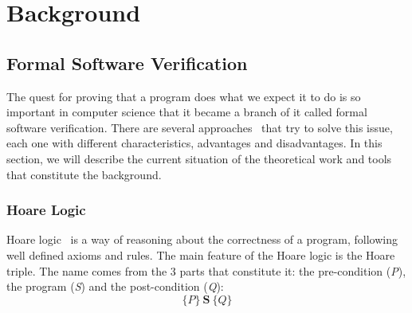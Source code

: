 
%

\newcommand{\provername}[1]{\cellcolor{yellow!25}
\begin{sideways}\textbf{#1}~~\end{sideways}}
\newcommand{\explanation}[1]{\cellcolor{yellow!13}lemma \texttt{#1}}
\newcommand{\transformation}[1]{\cellcolor{yellow!13}transformation \texttt{#1}}
\newcommand{\subgoal}[2]{\cellcolor{yellow!13}subgoal #2}
\newcommand{\valid}[1]{\cellcolor{green!13}#1}
\newcommand{\unknown}[1]{\cellcolor{red!20}#1}
\newcommand{\invalid}[1]{\cellcolor{red!50}#1}
\newcommand{\timeout}[1]{\cellcolor{red!20}(#1)}
\newcommand{\outofmemory}[1]{\cellcolor{red!20}(#1)}
\newcommand{\noresult}{\multicolumn{1}{>{\columncolor[gray]{0.8}}c|}{~}}
\newcommand{\highfailure}{\cellcolor{red!50}FAILURE}

\chapter{Background}
\label{cha:background}

\glsresetall


\section{Formal Software Verification}
\label{sec:formal_software_verification}

The quest for proving that a program does what we expect it to do is so important in computer science that it became a branch of it called formal software verification. 
There are several approaches~\cite{DBLP:conf/fm/BrainP24} that try to solve this issue, each one with different characteristics, advantages and disadvantages. 
In this section, we will describe the current situation of the theoretical work and tools that constitute the background.


\subsection{Hoare Logic} 
\label{sub:hoare_logic}

Hoare logic~\cite{hoare69} is a way of reasoning about the correctness of a program, following well defined axioms and rules.
The main feature of the Hoare logic is the Hoare triple. 
The name comes from the 3 parts that constitute it: the pre-condition (\emph{P}), the program (\emph{S}) and the post-condition (\emph{Q}):
\[ \{P\} \ \textbf{S} \ \{Q\} \]


